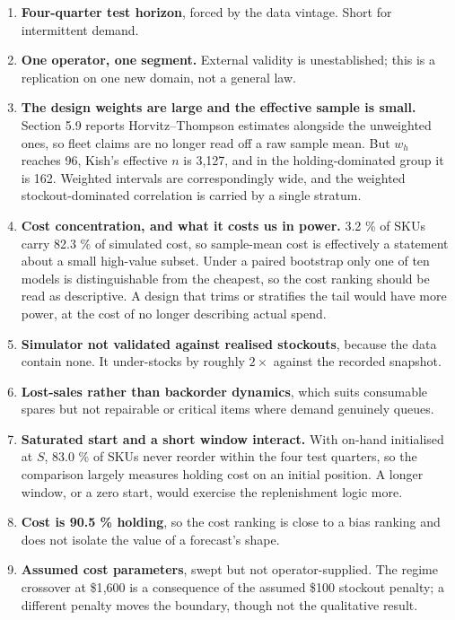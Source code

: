 \documentclass[11pt]{article}
\begin{document}
\begin{enumerate}
\item \textbf{Four-quarter test horizon}, forced by the data vintage. Short for
  intermittent demand.
\item \textbf{One operator, one segment.} External validity is unestablished;
  this is a replication on one new domain, not a general law.
\item \textbf{The design weights are large and the effective sample is small.}
  Section 5.9 reports Horvitz--Thompson estimates alongside the unweighted
  ones, so fleet claims are no longer read off a raw sample mean. But $w_h$
  reaches 96, Kish's effective $n$ is 3{,}127, and in the holding-dominated
  group it is 162. Weighted intervals are correspondingly wide, and the
  weighted stockout-dominated correlation is carried by a single stratum.
\item \textbf{Cost concentration, and what it costs us in power.} 3.2 \% of
  SKUs carry 82.3 \% of simulated cost, so sample-mean cost is effectively a
  statement about a small high-value subset. Under a paired bootstrap only one
  of ten models is distinguishable from the cheapest, so the cost ranking
  should be read as descriptive. A design that trims or stratifies the tail
  would have more power, at the cost of no longer describing actual spend.
\item \textbf{Simulator not validated against realised stockouts}, because the
  data contain none. It under-stocks by roughly $2\times$ against the recorded
  snapshot.
\item \textbf{Lost-sales rather than backorder dynamics}, which suits
  consumable spares but not repairable or critical items where demand genuinely
  queues.
\item \textbf{Saturated start and a short window interact.} With on-hand
  initialised at $S$, 83.0 \% of SKUs never reorder within the four test
  quarters, so the comparison largely measures holding cost on an initial
  position. A longer window, or a zero start, would exercise the replenishment
  logic more.
\item \textbf{Cost is 90.5 \% holding}, so the cost ranking is close to a bias
  ranking and does not isolate the value of a forecast's shape.
\item \textbf{Assumed cost parameters}, swept but not operator-supplied. The
  regime crossover at \$1{,}600 is a consequence of the assumed \$100 stockout
  penalty; a different penalty moves the boundary, though not the qualitative
  result.

\end{enumerate}
\end{document}

